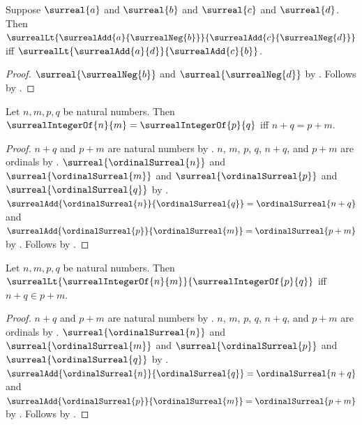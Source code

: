 \begin{lemma}\label{surreal_difference_order_iff}
    Suppose $\surreal{a}$ and $\surreal{b}$ and
        $\surreal{c}$ and $\surreal{d}$.
    Then
        $\surrealLt
            {\surrealAdd{a}{\surrealNeg{b}}}
            {\surrealAdd{c}{\surrealNeg{d}}}$ iff
        $\surrealLt{\surrealAdd{a}{d}}{\surrealAdd{c}{b}}$.
\end{lemma}
\begin{proof}
    $\surreal{\surrealNeg{b}}$ and $\surreal{\surrealNeg{d}}$
        by .
    Follows by
        .
\end{proof}

\begin{theorem}\label{surreal_integer_of_equality_iff}
    Let $n,m,p,q$ be natural numbers.
    Then
        $\surrealIntegerOf{n}{m}=\surrealIntegerOf{p}{q}$ iff
        $n+q=p+m$.
\end{theorem}
\begin{proof}
    $n+q$ and $p+m$ are natural numbers
        by .
    $n$, $m$, $p$, $q$, $n+q$, and $p+m$ are ordinals
        by .
    $\surreal{\ordinalSurreal{n}}$ and
        $\surreal{\ordinalSurreal{m}}$ and
        $\surreal{\ordinalSurreal{p}}$ and
        $\surreal{\ordinalSurreal{q}}$
        by .
    $\surrealAdd{\ordinalSurreal{n}}{\ordinalSurreal{q}}
        =\ordinalSurreal{n+q}$ and
        $\surrealAdd{\ordinalSurreal{p}}{\ordinalSurreal{m}}
        =\ordinalSurreal{p+m}$
        by .
    Follows by
        .
\end{proof}

\begin{theorem}\label{surreal_integer_of_order_iff}
    Let $n,m,p,q$ be natural numbers.
    Then
        $\surrealLt
            {\surrealIntegerOf{n}{m}}
            {\surrealIntegerOf{p}{q}}$ iff
        $n+q\in p+m$.
\end{theorem}
\begin{proof}
    $n+q$ and $p+m$ are natural numbers
        by .
    $n$, $m$, $p$, $q$, $n+q$, and $p+m$ are ordinals
        by .
    $\surreal{\ordinalSurreal{n}}$ and
        $\surreal{\ordinalSurreal{m}}$ and
        $\surreal{\ordinalSurreal{p}}$ and
        $\surreal{\ordinalSurreal{q}}$
        by .
    $\surrealAdd{\ordinalSurreal{n}}{\ordinalSurreal{q}}
        =\ordinalSurreal{n+q}$ and
        $\surrealAdd{\ordinalSurreal{p}}{\ordinalSurreal{m}}
        =\ordinalSurreal{p+m}$
        by .
    Follows by
        .
\end{proof}


